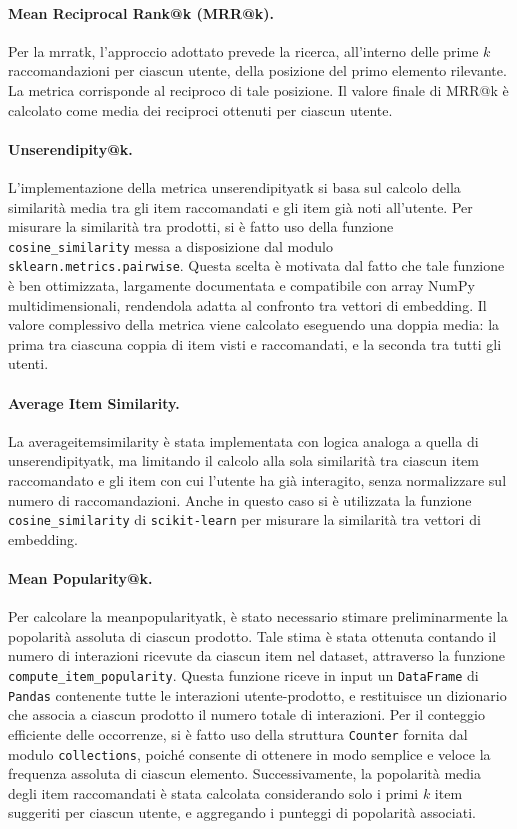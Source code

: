 \paragraph{Mean Reciprocal Rank@k (MRR@k).}
Per la \gls{mrratk}, l’approccio adottato prevede la ricerca, all’interno delle prime $k$ raccomandazioni per ciascun utente, della posizione del primo elemento rilevante. La metrica corrisponde al reciproco di tale posizione. Il valore finale di MRR@k è calcolato come media dei reciproci ottenuti per ciascun utente.

\paragraph{Unserendipity@k.}
L’implementazione della metrica \gls{unserendipityatk} si basa sul calcolo della similarità media tra gli item raccomandati e gli item già noti all’utente. Per misurare la similarità tra prodotti, si è fatto uso della funzione \texttt{cosine\_similarity} messa a disposizione dal modulo \texttt{sklearn.metrics.pairwise}. Questa scelta è motivata dal fatto che tale funzione è ben ottimizzata, largamente documentata e compatibile con array NumPy multidimensionali, rendendola adatta al confronto tra vettori di embedding. Il valore complessivo della metrica viene calcolato eseguendo una doppia media: la prima tra ciascuna coppia di item visti e raccomandati, e la seconda tra tutti gli utenti.

\paragraph{Average Item Similarity.}
La \gls{averageitemsimilarity} è stata implementata con logica analoga a quella di \gls{unserendipityatk}, ma limitando il calcolo alla sola similarità tra ciascun item raccomandato e gli item con cui l’utente ha già interagito, senza normalizzare sul numero di raccomandazioni. Anche in questo caso si è utilizzata la funzione \texttt{cosine\_similarity} di \texttt{scikit-learn} per misurare la similarità tra vettori di embedding.

\paragraph{Mean Popularity@k.}
Per calcolare la \gls{meanpopularityatk}, è stato necessario stimare preliminarmente la popolarità assoluta di ciascun prodotto. Tale stima è stata ottenuta contando il numero di interazioni ricevute da ciascun item nel dataset, attraverso la funzione \texttt{compute\_item\_popularity}. Questa funzione riceve in input un \texttt{DataFrame} di \texttt{Pandas} contenente tutte le interazioni utente-prodotto, e restituisce un dizionario che associa a ciascun prodotto il numero totale di interazioni. Per il conteggio efficiente delle occorrenze, si è fatto uso della struttura \texttt{Counter} fornita dal modulo \texttt{collections}, poiché consente di ottenere in modo semplice e veloce la frequenza assoluta di ciascun elemento.
Successivamente, la popolarità media degli item raccomandati è stata calcolata considerando solo i primi $k$ item suggeriti per ciascun utente, e aggregando i punteggi di popolarità associati.

